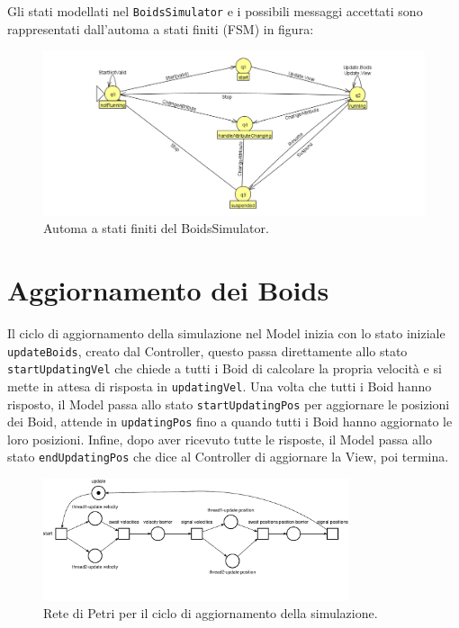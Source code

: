 \documentclass[a4paper,12pt]{report}
\begin{document}
        Gli stati modellati nel \texttt{BoidsSimulator} e i possibili messaggi accettati sono rappresentati dall'automa a stati finiti (FSM) in figura:
        \begin{figure}[ht!]
            \centering
            \includegraphics[width=\textwidth]{img/FSM/Simulator.png}
            \caption{Automa a stati finiti del BoidsSimulator.}
            \label{fig:Boids_simulator_fsm}
        \end{figure}
    
    \section{Aggiornamento dei Boids}

        Il ciclo di aggiornamento della simulazione nel Model inizia con lo stato iniziale \texttt{updateBoids}, creato dal Controller, questo passa direttamente allo stato \texttt{startUpdatingVel} che chiede a tutti i Boid di calcolare la propria velocità e si mette in attesa di risposta in \texttt{updatingVel}. Una volta che tutti i Boid hanno risposto, il Model passa allo stato \texttt{startUpdatingPos} per aggiornare le posizioni dei Boid, attende in \texttt{updatingPos} fino a quando tutti i Boid hanno aggiornato le loro posizioni. 
        Infine, dopo aver ricevuto tutte le risposte, il Model passa allo stato \texttt{endUpdatingPos} che dice al Controller di aggiornare la View, poi termina.
                
        \begin{figure}[ht!]
            \centering
            \includegraphics[width=0.8\textwidth]{petri_nets_pdf/rete_update_cycle.pdf}
            \caption{Rete di Petri per il ciclo di aggiornamento della simulazione.}
            \label{fig:rete_update_cycle}
        \end{figure}
        
\end{document}
